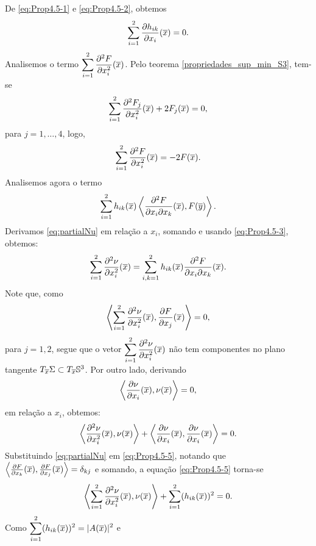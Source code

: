 \begin{demonstracao}
	De \eqref{eq:Prop4.5-1} e \eqref{eq:Prop4.5-2}, obtemos
	\begin{eqnarray}\label{eq:Prop4.5-3}
	\sum_{i=1}^2\frac{\partial h_{ik}}{\partial x_i}(\overline{x}) = 0.
	\end{eqnarray}
	Analisemos o termo 
	$\displaystyle\sum_{i=1}^2 \frac{\partial^2 F}{\partial x_i^2}(\overline{x})$. 
	Pelo teorema \ref{propriedades_sup_min_S3}, tem-se
	\begin{equation*}
	\sum_{i=1}^2 \frac{\partial^2 F_j}{\partial x_i^2}(\overline{x}) + 2F_j(\overline{x}) = 0,
	\end{equation*}
	para $j=1,\ldots,4$, logo,
	\[
	\sum_{i=1}^2 \frac{\partial^2 F}{\partial x_i^2}(\overline{x}) = -2 F(\overline{x}).
	\]
	Analisemos agora o termo 
	\[
	\sum_{i=1}^2 h_{ik}(\overline{x}) \left\langle \frac{\partial^2 F}
	{\partial x_i \partial x_k}(\overline{x}), F(\overline{y}) \right\rangle.
	\]
	Derivamos \eqref{eq:partialNu} em rela\c c\~ao a $x_i$, somando
	e usando \eqref{eq:Prop4.5-3}, obtemos:
	\begin{eqnarray}\label{eq:Prop4.5-4}
	\sum_{i=1}^2 \frac{\partial^2 \nu}{\partial x_i^2}(\overline{x}) = 
	\sum_{i,k=1}^2 h_{ik}(\overline{x})\frac{\partial^2 F}{\partial x_i \partial x_k}(\overline{x}).
	\end{eqnarray}
	Note que, como
	\[
	\left\langle \sum_{i=1}^2 \frac{\partial^2 \nu}{\partial x_i^2}(\overline{x}), 
	\frac{\partial F}{\partial x_j}(\overline{x}) \right\rangle = 0,
	\]
	para $j=1,2$, segue que o vetor
	$\displaystyle\sum_{i=1}^2 \frac{\partial^2 \nu}{\partial x_i^2}(\overline{x})$ 
	não tem componentes no plano tangente 
	$T_{\overline{x}}\Sigma\subset T_{\overline{x}}\mathbb{S}^3$. 
	Por outro lado, derivando
	\[
	\left\langle \frac{\partial \nu}{\partial x_i}(\overline{x}), \nu(\overline{x}) \right\rangle = 0,
	\]
	em rela\c c\~ao a $x_i$, obtemos:
	\begin{equation}\label{eq:Prop4.5-5}
	\left\langle \frac{\partial^2 \nu}{\partial x_i^2}(\overline{x}), \nu(\overline{x})\right\rangle 
	+ \left\langle \frac{\partial \nu}{\partial x_i}(\overline{x}), 
	\frac{\partial \nu}{\partial x_i}(\overline{x}) \right\rangle = 0.
	\end{equation}	
	Substituindo \eqref{eq:partialNu} em \eqref{eq:Prop4.5-5}, notando que
	$\left\langle \frac{\partial F}{\partial x_k}(\overline{x}), 
	\frac{\partial F}{\partial x_j}(\overline{x}) \right\rangle = \delta_{kj}$ e somando,
	a equa\c c\~ao \eqref{eq:Prop4.5-5} torna-se
	\begin{equation*}
	\left\langle \sum_{i=1}^2 \frac{\partial^2 \nu}{\partial x_i^2}(\overline{x}), \nu(\overline{x})
	\right\rangle + \sum_{i=1}^2 (h_{ik}(\overline{x}))^2 = 0.
	\end{equation*}	
	Como $\displaystyle\sum_{i=1}^2 (h_{ik}(\overline{x}))^2 = |A(\overline{x})|^2$ e

\end{demonstracao}
